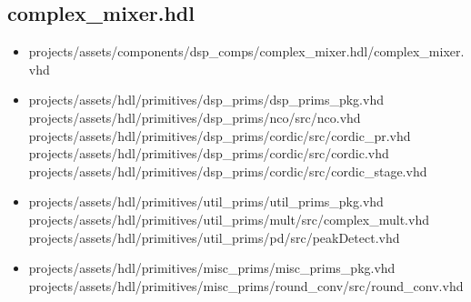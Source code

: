 \documentclass{article}
\def\comp{complex\_mixer}
\begin{document}
\subsection*{\comp.hdl}
\begin{itemize}
	\item projects/assets/components/dsp\_comps/complex\_mixer.hdl/complex\_mixer.vhd
	\item projects/assets/hdl/primitives/dsp\_prims/dsp\_prims\_pkg.vhd
	      \subitem projects/assets/hdl/primitives/dsp\_prims/nco/src/nco.vhd
	      \subitem projects/assets/hdl/primitives/dsp\_prims/cordic/src/cordic\_pr.vhd
	      \subitem projects/assets/hdl/primitives/dsp\_prims/cordic/src/cordic.vhd
	      \subitem projects/assets/hdl/primitives/dsp\_prims/cordic/src/cordic\_stage.vhd
	\item projects/assets/hdl/primitives/util\_prims/util\_prims\_pkg.vhd
	      \subitem projects/assets/hdl/primitives/util\_prims/mult/src/complex\_mult.vhd
	      \subitem projects/assets/hdl/primitives/util\_prims/pd/src/peakDetect.vhd
	\item projects/assets/hdl/primitives/misc\_prims/misc\_prims\_pkg.vhd
	      \subitem projects/assets/hdl/primitives/misc\_prims/round\_conv/src/round\_conv.vhd
\end{itemize}
\end{document}
